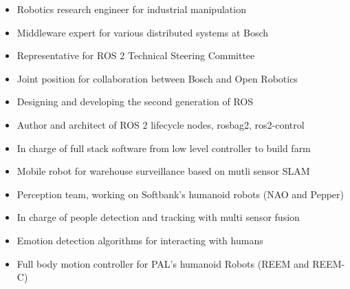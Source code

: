 \documentclass[11pt,a4paper,sans]{moderncv} %
\begin{document}
\begin{itemize}
\setlength{\itemindent}{1in}
\item Robotics research engineer for industrial manipulation
\item Middleware expert for various distributed systems at Bosch
\item Representative for ROS 2 Technical Steering Committee
\end{itemize}

\begin{itemize}
\setlength{\itemindent}{1in}
\item Joint position for collaboration between Bosch and Open Robotics
\item Designing and developing the second generation of ROS
\item Author and architect of ROS 2 lifecycle nodes, rosbag2, ros2-control
\end{itemize}

\begin{itemize}
\setlength{\itemindent}{1in}
\item In charge of full stack software from low level controller to build farm
\item Mobile robot for warehouse surveillance based on mutli sensor SLAM
\end{itemize}

\begin{itemize}
\setlength{\itemindent}{1in}
\item Perception team, working on Softbank’s humanoid robots (NAO and Pepper)
\item In charge of people detection and tracking with multi sensor fusion
\item Emotion detection algorithms for interacting with humans
\end{itemize}

\begin{itemize}
\setlength{\itemindent}{1in}
\item Full body motion controller for PAL’s humanoid Robots (REEM and REEM-C)
\end{itemize}
\end{document}
